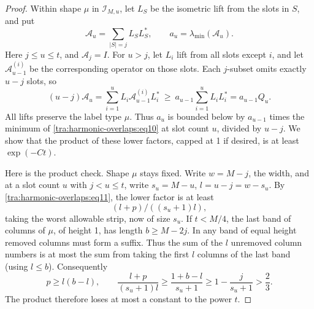 \begin{proof}
\label{tra:harmonic-overlaps:lifting-product-bound}
Within shape \(\mu\) in \(\mathcal I_{M,u}\), let \(L_S\) be the isometric lift from the slots in \(S\), and put
\[
 \mathcal A_u=\sum_{|S|=j}L_SL_S^*,\qquad
 a_u=\lambda_{\min}(\mathcal A_u).
\]
Here \(j\le u\le t\), and \(\mathcal A_j=I\). For \(u>j\), let \(L_i\) lift from all slots except \(i\), and let \(\mathcal A_{u-1}^{(i)}\) be the corresponding operator on those slots. Each \(j\)-subset omits exactly \(u-j\) slots, so
\[
 (u-j)\mathcal A_u
   =\sum_{i=1}^u L_i\mathcal A_{u-1}^{(i)}L_i^*
   \ \ge\ a_{u-1}\sum_{i=1}^u L_iL_i^*
   =a_{u-1}Q_u.
\]
All lifts preserve the label type \(\mu\). Thus \(a_u\) is bounded below by \(a_{u-1}\) times the minimum of \eqref{tra:harmonic-overlaps:eq10} at slot count \(u\), divided by \(u-j\). We show that the product of these lower factors, capped at 1 if desired, is at least \(\exp(-Ct)\).

Here is the product check. Shape \(\mu\) stays fixed. Write \(w=M-j\), the width, and at a slot count \(u\) with \(j<u\le t\), write \(s_u=M-u\), \(l=u-j=w-s_u\). By \eqref{tra:harmonic-overlaps:eq11}, the lower factor is at least
\begin{equation}
                    (l+p)/((s_u+1)l),                                    \label{tra:harmonic-overlaps:eq12}
\end{equation}
taking the worst allowable strip, now of size \(s_u\).
If \(t<M/4\), the last band of columns of \(\mu\), of height 1, has length \(b\ge M-2j\). In any band of equal height removed columns must form a suffix. Thus the sum of the \(l\) unremoved column numbers is at most the sum from taking the first \(l\) columns of the last band (using \(l\le b\)). Consequently
\[
 p\ge l(b-l),\qquad
 \frac{l+p}{(s_u+1)l}
   \ge\frac{1+b-l}{s_u+1}
   \ge1-\frac{j}{s_u+1}>\frac23.
\]
The product therefore loses at most a constant to the power \(t\).


\end{proof}

